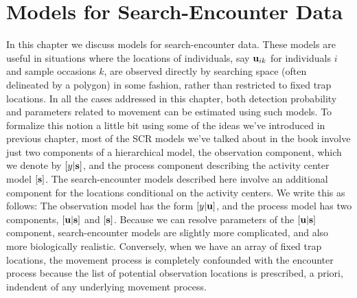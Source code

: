 \chapter{Models for  Search-Encounter Data}
\label{chapt.search-encounter}

\vspace{0.3cm}


In this chapter we discuss models for search-encounter data. These
models are useful in situations where the locations of individuals,
say ${\bf u}_{ik}$ for individuals $i$ and sample occasions $k$, are
observed directly by searching space (often delineated by a polygon)
in some fashion, rather than restricted to fixed trap locations.  In
all the cases addressed in this chapter, both detection probability
and parameters related to movement can be estimated using such models.
To formalize this notion a little bit using some of the ideas we've
introduced in previous chapter, most of the SCR models we've talked about in the book involve just two
components of a hierarchical model, the observation component, which
we denote  by $[y|{\bf s}]$, and the process component describing
the activity center model $[{\bf s}]$.  The search-encounter models
described here involve an additional component for the locations
conditional on the activity centers. We write this as follows: The
observation model has the form $[y|{\bf u}]$, and the process model
has two components, $[{\bf u}|{\bf s}]$ and $[{\bf s}]$. Because we
can resolve parameters of the $[{\bf u}|{\bf s}]$ component,
search-encounter models are slightly more complicated, and also
more biologically realistic.
Conversely, when we have an array of fixed trap locations, the
movement process is completely confounded with the encounter process
because the list of potential observation locations is prescribed, a
priori, indendent of any underlying movement process.


